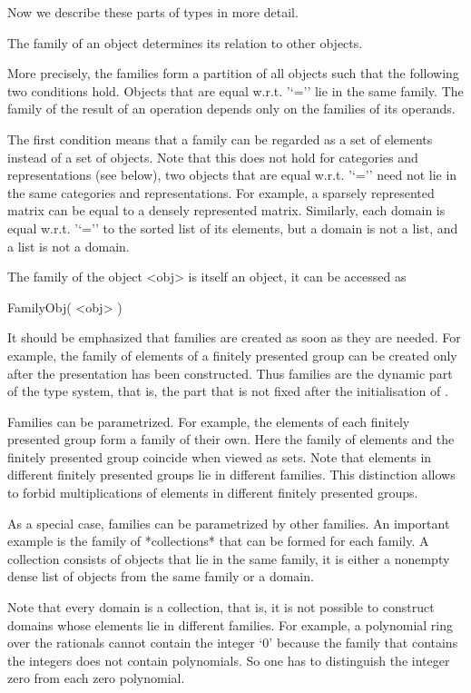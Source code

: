 Now we describe these parts of types in more detail.


The family of an object determines its relation to other objects.

More precisely, the families form a partition of all {\GAP} objects
such that the following two conditions hold.
Objects that are equal w.r.t. '`='' lie in the same family.
The family of the result of an operation depends only on the families
of its operands.

The first condition means that a family can be regarded as a set of
elements instead of a set of objects.
Note that this does not hold for categories and representations
(see below),
two objects that are equal w.r.t. '`='' need not lie in the same
categories and representations.
For example, a sparsely represented matrix can be equal to a densely
represented matrix.
Similarly, each domain is equal w.r.t. '`='' to the sorted list of its
elements, but a domain is not a list, and a list is not a domain.

The family of the object <obj> is itself an object,
it can be accessed as

\>FamilyObj( <obj> )

It should be emphasized that families are created as soon as they are
needed.
For example, the family of elements of a finitely presented group
can be created only after the presentation has been constructed.
Thus families are the dynamic part of the type system,
that is, the part that is not fixed after the initialisation of {\GAP}.

Families can be parametrized.
For example, the elements of each finitely presented group form a family
of their own.
Here the family of elements and the finitely presented group
coincide when viewed as sets.
Note that elements in different finitely presented groups lie in
different families.
This distinction allows {\GAP} to forbid multiplications of elements
in different finitely presented groups.

As a special case, families can be parametrized by other families.
An important example is the family of *collections* that can be formed
for each family.
A collection consists of objects that lie in the same family,
it is either a nonempty dense list of objects from the same family
or a domain.

Note that every domain is a collection, that is,
it is not possible to construct domains whose elements lie in different
families.
For example, a polynomial ring over the rationals cannot contain
the integer `0' because the family that contains the integers
does not contain polynomials.
So one has to distinguish the integer zero from each zero polynomial.

